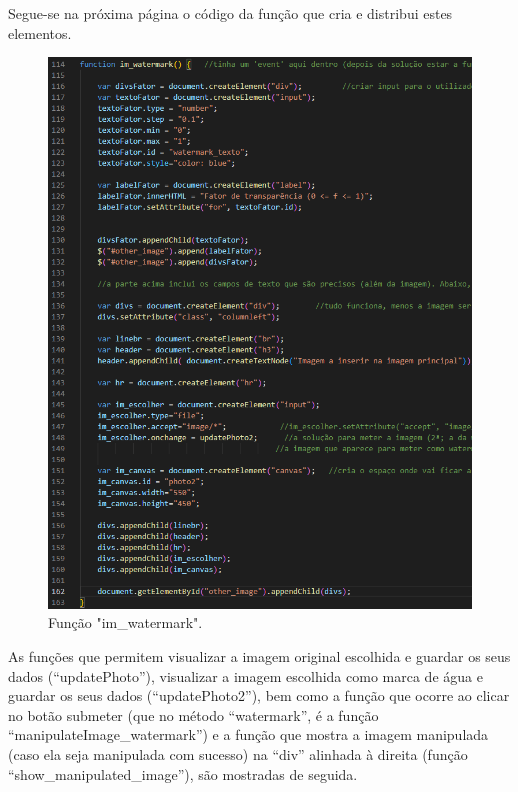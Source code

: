 \documentclass{report}
\begin{document}
\linebreak
 \bigskip

 	Segue-se na próxima página o código da função que cria e distribui estes elementos.

  \newpage


\begin{figure}[!hbtp]
        \centering
        \includegraphics[scale=0.7]{Images_code/12 - image manipulation js watermark im_watermark.png}
        \caption{\label{Estrutura}Função "im\_watermark".}
\end{figure}

\newpage



    	As funções que permitem visualizar a imagem original escolhida e guardar os seus dados (“updatePhoto”), visualizar a imagem escolhida como marca de água e guardar os seus dados (“updatePhoto2”), bem como a função que ocorre ao clicar no botão submeter (que no método “watermark”, é a função “manipulateImage\_watermark”) e a função que mostra a imagem manipulada (caso ela seja manipulada com sucesso) na “div” alinhada à direita (função “show\_manipulated\_image”), são mostradas de seguida.
\end{document}

